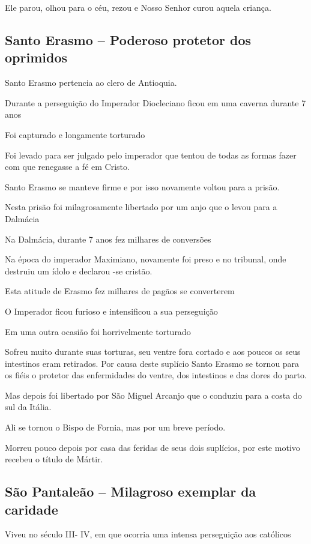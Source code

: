 \documentclass[a4paper,12pt]{extarticle} \usepackage[utf8]{inputenc}
\begin{document}
Ele parou, olhou para o céu, rezou e Nosso Senhor curou aquela criança.


\subsection{Santo Erasmo – Poderoso protetor dos oprimidos}

Santo Erasmo pertencia ao clero de Antioquia.

Durante a perseguição do Imperador Diocleciano ficou em uma caverna durante 7 anos

Foi capturado e longamente torturado

Foi levado para ser julgado pelo imperador que tentou de todas as formas fazer com que renegasse a fé em Cristo.

Santo Erasmo se manteve firme e por isso novamente voltou para a prisão.

Nesta prisão foi milagrosamente libertado por um anjo que o levou para a Dalmácia

Na Dalmácia, durante 7 anos fez milhares de conversões

Na época do imperador Maximiano, novamente foi preso e no tribunal, onde destruiu um ídolo e declarou -se cristão.

Esta atitude de Erasmo fez milhares de pagãos se converterem

O Imperador ficou furioso e intensificou a sua perseguição

Em uma outra ocasião foi horrivelmente torturado

 

Sofreu muito durante suas torturas, seu ventre fora cortado e aos poucos os seus intestinos eram retirados. Por causa deste suplício Santo Erasmo se tornou para os fiéis o protetor das enfermidades do ventre, dos intestinos e das dores do parto.

Mas depois foi libertado por São Miguel Arcanjo que o conduziu para a costa do sul da Itália.

Ali se tornou o Bispo de Fornia, mas por um breve período.

Morreu pouco depois por casa das feridas de seus dois suplícios, por este motivo recebeu o título de Mártir.
 

\subsection{São Pantaleão – Milagroso exemplar da caridade}

Viveu no século III- IV, em que ocorria uma intensa perseguição aos católicos
\end{document}
